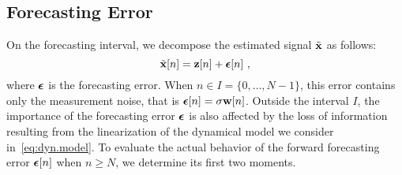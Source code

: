 \subsection{Forecasting Error}
On the forecasting interval, we decompose the estimated signal $\tilde{{\mathbf x}}$ as follows:
\begin{equation}
\tilde \bx[n] = \bz[n] + \bepsilon[n]\ ,
\label{eq:forecasting.error}
\end{equation}
where $\boldsymbol{\epsilon}$ is the forecasting error. When $n\in I=\{0,\dots,N-1\}$, this error contains only the measurement noise, that is $\boldsymbol{\epsilon}[n]=\sigma{\mathbf w}[n]$. Outside the interval $I$, the importance of the forecasting error $\boldsymbol{\epsilon}$ is also affected by the loss of information resulting from the linearization of the dynamical model we consider in~\eqref{eq:dyn.model}. To evaluate the actual behavior of the forward forecasting error $\boldsymbol{\epsilon}[n]$ when $n\geq N$, we determine its first two moments.
